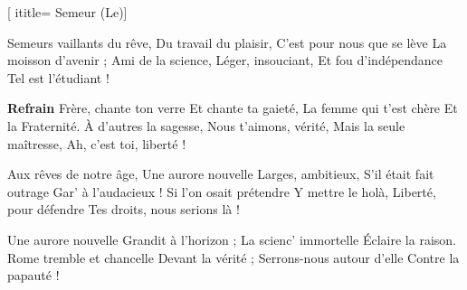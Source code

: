  [
ititle= {Semeur (Le)}]


\beginverse
Semeurs vaillants du rêve,
Du travail du plaisir,
C'est pour nous que se lève
La moisson d'avenir ;
Ami de la science,
Léger, insouciant,
Et fou d'indépendance
Tel est l'étudiant !
\endverse

\beginchorus
\textbf {Refrain}
Frère, chante ton verre
Et chante ta gaieté,
La femme qui t'est chère
Et la Fraternité.
À d'autres la sagesse,
Nous t'aimons, vérité,
Mais la seule maîtresse,
Ah, c'est toi, liberté !
\endchorus

\beginverse
Aux rêves de notre âge, Une aurore nouvelle
Larges, ambitieux, 
S'il était fait outrage 
Gar' à l'audacieux ! 
Si l'on osait prétendre 
Y mettre le holà, 
Liberté, pour défendre 
Tes droits, nous serions là !
\endverse

\beginverse 
Une aurore nouvelle
Grandit à l'horizon ;
La scienc' immortelle
Éclaire la raison.
Rome tremble et chancelle
Devant la vérité ;
Serrons-nous autour d'elle
Contre la papauté !
\endverse

\endsong
